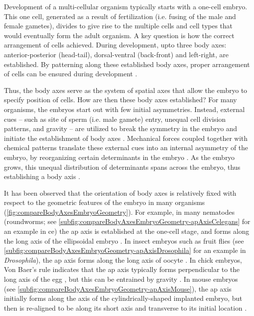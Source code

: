 Development of a multi-cellular organism typically starts with a one-cell embryo. This one cell, generated as a result of fertilization (i.e. fusing of the male and female gametes), divides to give rise to the multiple cells and cell types that would eventually form the adult organism. A key question is how the correct arrangement of cells achieved. During development, upto three body axes: anterior-posterior (head-tail), dorsal-ventral (back-front) and left-right, are established. By patterning along these established body axes, proper arrangement of cells can be ensured during development \citep{goldstein1997axis}.

Thus, the body axes serve as the system of spatial axes that allow the embryo to specify position of cells. How are then these body axes established? For many organisms, the embryos start out with few initial asymmetries. Instead, external cues -- such as site of sperm (i.e. male gamete) entry, unequal cell division patterns, and gravity -- are utilized to break the symmetry in the embryo and initiate the establishment of body axes \citep{goldstein1997axis}. Mechanical forces coupled together with chemical patterns translate these external cues into an internal asymmetry of the embryo, by reorganizing certain determinants in the embryo \citep{goldstein1997axis,gross2017active}. As the embryo grows, this unequal distribution of determinants spans across the embryo, thus establishing a body axis \citep{meinhardt2015models,meinhardt2008models}.

It has been observed that the orientation of body axes is relatively fixed with respect to the geometric features of the embryo in many organisms (\autoref{fig:compareBodyAxesEmbryoGeometry}). For example, in many nematodes (roundworms; see \autoref{subfig:compareBodyAxesEmbryoGeometry-apAxisCelegans} for an example in \ac{ce}) the \acl{ap} axis is established at the one-cell stage, and forms along the long axis of the ellipsoidal embryo \citep{goldstein1997axis,goldstein1996specification}. In insect embryos such as fruit flies (see \autoref{subfig:compareBodyAxesEmbryoGeometry-apAxisDrosophila} for an example in \textit{Drosophila}), the \ac{ap} axis forms along the long axis of oocyte \citep{goldstein1997axis,dicko2017geometry,quinlan2016cytoplasmic,shulman2000drosophila,gonzalez1994role}. In chick embryos, Von Baer's rule indicates that the \ac{ap} axis typically forms perpendicular to the long axis of the egg \citep{goldstein1997axis,von1828entwicklungsgeschichte}, but this can be entrained by gravity \citep{kochav1971bilateral}. In mouse embryos (see \autoref{subfig:compareBodyAxesEmbryoGeometry-apAxisMouse}), the \ac{ap} axis initially forms along the axis of the cylindrically-shaped implanted embryo, but then is re-aligned to be along its short axis and transverse to its initial location \citep{tam2004embryonic,vianello2019understanding,hiramatsu2013external,matsuo2017mechanical}. 

